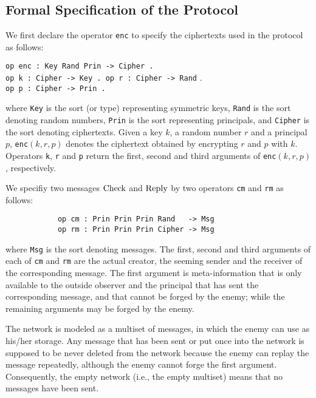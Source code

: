 \documentclass[10pt, conference, compsocconf]{IEEEtran}
\begin{document}
	
	\subsection{Formal Specification of the Protocol}
	We first declare the operator \verb!enc! to specify the ciphertexts used in the protocol as follows:
	
	\smallskip
	\begin{small}
		\noindent
		\verb!op enc : Key Rand Prin -> Cipher .!\\
		\verb!op k : Cipher -> Key . op r : Cipher -> Rand! .\\
		\verb!op p : Cipher -> Prin .!
	\end{small}
	\smallskip
	
	\noindent
	where \verb!Key! is the sort (or type) representing symmetric keys,
	\verb!Rand! is the sort denoting random numbers, 
	\verb!Prin! is the sort representing principals, and
	\verb!Cipher! is the sort denoting ciphertexts.
	Given a key $k$, a random number $r$ and a principal $p$, 
	\verb!enc!$(k,r,p)$ denotes the ciphertext obtained by encrypting $r$ and $p$ with $k$.
	Operators \verb!k!, \verb!r! and \verb!p! return the first, second and third arguments of \verb!enc!$(k, r, p)$, respectively.
	
	
	We specifiy two messages $\rm Check$ and $\rm Reply$ by two operators \verb!cm! and \verb!rm! as follows:
	\begin{small}
		\begin{verbatim}
			op cm : Prin Prin Prin Rand   -> Msg
			op rm : Prin Prin Prin Cipher -> Msg
		\end{verbatim}
	\end{small}
	
	\noindent
	where \verb!Msg! is the sort denoting messages.
	The first, second and third arguments of each of \verb!cm! and \verb!rm! are the actual creator, the seeming sender and the receiver of the corresponding message. The first argument is meta-information that is only available to the outside observer and the principal that has sent the corresponding message, and that cannot be forged by the enemy; while the remaining arguments may be forged by the enemy. 
	
	The network is modeled as a multiset of messages, in which the enemy can use as his/her storage. Any message that has been sent or put once into the network is supposed to be never deleted from the network because the enemy can replay the message repeatedly, although the enemy cannot forge the first argument. Consequently, the empty network (i.e., the empty multiset) means that no messages have been sent.
	
\end{document}
